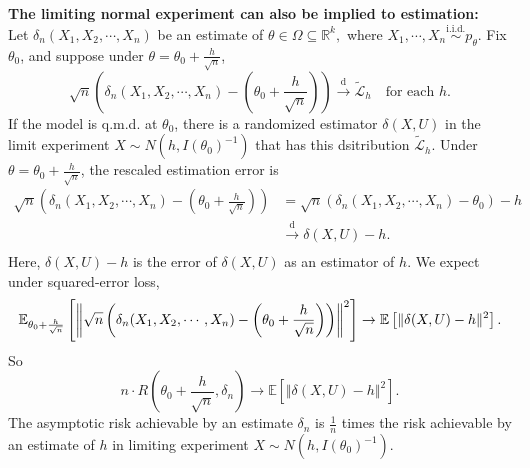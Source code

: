 \documentclass[a4paper]{article}
\begin{document}
\textbf{The limiting normal experiment can also be implied to estimation:} \\
Let $\delta_n \left(X_1,X_2,\cdots,X_n\right)$ be an estimate of $\theta \in \Omega \subseteq \mathbb{R}^k,$ where $X_1,\cdots,X_n \stackrel{\text{i.i.d.}}{\sim} p_{\theta}$. Fix $\theta_0$, and suppose under $\theta = \theta_0 + \frac{h}{\sqrt{n}}$,
\begin{equation*}
	\sqrt{n} \left(\delta_n(X_1,X_2,\cdots,X_n) - \left(\theta_0 + \frac{h}{\sqrt{n}}\right)\right) \stackrel{\text{d}}{\longrightarrow} \tilde{\mathcal{L}}_h \quad \text{for each $h$.}
\end{equation*}
If the model is q.m.d. at $\theta_0$, there is a randomized estimator $\delta(X,U)$ in the limit experiment $X \sim N \left(h,I(\theta_0)^{-1}\right)$ that has this dsitribution $\tilde{\mathcal{L}}_h$. Under $\theta = \theta_0 + \frac{h}{\sqrt{n}}$, the rescaled estimation error is
\begin{equation*}
	\begin{aligned}
		\sqrt{n} \left(\delta_n(X_1,X_2,\cdots,X_n) - \left(\theta_0 + \frac{h}{\sqrt{n}}\right)\right)
		& = \sqrt{n} \left(\delta_n(X_1,X_2,\cdots,X_n) - \theta_0\right) - h \\
		&  \stackrel{\text{d}}{\longrightarrow} \delta(X,U) - h. \\
	\end{aligned}
\end{equation*}
Here, $\delta(X,U) - h$ is the error of $\delta(X,U)$ as an estimator of $h$.
We expect under squared-error loss,
\begin{equation*}
	\mathbb{E}_{\theta_0 + \frac{h}{\sqrt{n}}} \left[\left\Vert \sqrt{n} \left(\delta_n(X_1,X_2,\cdots,X_n) - \left(\theta_0 + \frac{h}{\sqrt{n}}\right)\right) \right\Vert^2\right] \to \mathbb{E}\left[ \Vert \delta(X,U) - h \Vert^2\right]. \\
\end{equation*}
So
\begin{equation*}
	n \cdot R \left(\theta_0 + \frac{h}{\sqrt{n}}, \delta_n\right) \to \mathbb{E}\left[ \Vert \delta(X,U) - h \Vert^2\right].
\end{equation*}
The asymptotic risk achievable by an estimate $\delta_n$ is $\frac{1}{n}$ times the risk achievable by an estimate of $h$ in limiting experiment $X \sim N \left(h,I(\theta_0)^{-1}\right).$
\end{document}
